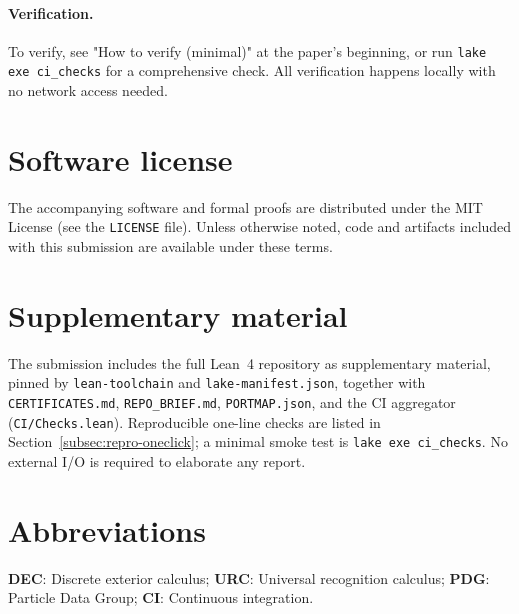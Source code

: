 \documentclass[11pt,a4paper,twoside]{article}
\numberwithin{equation}{section}
\theoremstyle{customthm}
\theoremstyle{customdef}
\theoremstyle{customrem}
\begin{document}
\paragraph{Verification.} To verify, see "How to verify (minimal)" at the paper's beginning, or run \texttt{lake exe ci\_checks} for a comprehensive check. All verification happens locally with no network access needed.
\section*{Software license}\label{sec:license}
The accompanying software and formal proofs are distributed under the MIT License (see the \texttt{LICENSE} file). Unless otherwise noted, code and artifacts included with this submission are available under these terms.

\section*{Supplementary material}\label{sec:supplementary}
The submission includes the full Lean~4 repository as supplementary material, pinned by \texttt{lean-toolchain} and \texttt{lake-manifest.json}, together with \texttt{CERTIFICATES.md}, \texttt{REPO\_BRIEF.md}, \texttt{PORTMAP.json}, and the CI aggregator (\texttt{CI/Checks.lean}). Reproducible one-line checks are listed in Section~\ref{subsec:repro-oneclick}; a minimal smoke test is \texttt{lake exe ci\_checks}. No external I/O is required to elaborate any report.

\section*{Abbreviations}\label{sec:abbreviations}
\textbf{DEC}: Discrete exterior calculus; \textbf{URC}: Universal recognition calculus; \textbf{PDG}: Particle Data Group; \textbf{CI}: Continuous integration.

\end{document}
